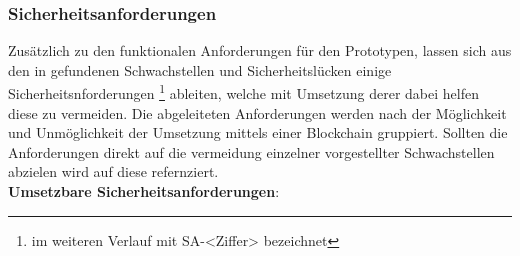 \subsubsection{Sicherheitsanforderungen}
\label{sec:prototype_sec}
    Zusätzlich zu den funktionalen Anforderungen für den Prototypen, lassen sich aus den in  gefundenen Schwachstellen und Sicherheitslücken einige Sicherheitsnforderungen
    \!\footnote{im weiteren Verlauf mit SA-<Ziffer> bezeichnet}
    ableiten, welche mit Umsetzung derer dabei helfen diese zu vermeiden.
    Die abgeleiteten Anforderungen werden nach der Möglichkeit und Unmöglichkeit der Umsetzung mittels einer Blockchain gruppiert.
    Sollten die Anforderungen direkt auf die vermeidung einzelner vorgestellter Schwachstellen abzielen wird auf diese refernziert.
    \bigskip\\
    \noindent \textbf{Umsetzbare Sicherheitsanforderungen}:
